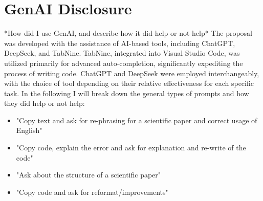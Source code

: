\documentclass[sigplan, nonacm]{acmart}
\begin{document}
    \section{GenAI Disclosure}
        *How did I use GenAI, and describe how it did help or not help*
        The proposal was developed with the assistance of AI-based tools, including ChatGPT, 
		DeepSeek, and TabNine. TabNine, integrated into Visual Studio Code, was utilized primarily 
		for advanced auto-completion, significantly expediting the process of writing code. ChatGPT 
		and DeepSeek were employed interchangeably, with the choice of tool depending on their 
		relative effectiveness for each specific task. In the following I will break down the 
		general types of prompts and how they did help or not help:
        \begin{itemize}
		\item "Copy text and ask for re-phrasing for a scientific paper and correct usage of 
			English"
		\item "Copy code, explain the error and ask for explanation and re-write of the code"
		\item "Ask about the structure of a scientific paper"
            \item "Copy code and ask for reformat/improvements"
	\end{itemize}
        
    
    
    
    
\end{document}
